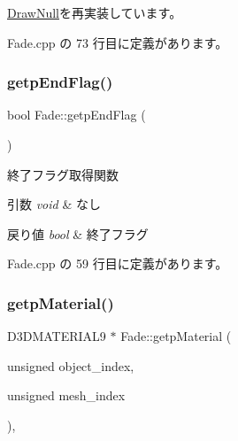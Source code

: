 \mbox{\hyperlink{class_draw_null_a98cc7cd43b19d9d70cc621d23d89286f}{Draw\+Null}}を再実装しています。



 Fade.\+cpp の 73 行目に定義があります。

\mbox{\label{class_fade_a7abd60e0881a5b7e9548ec544a0e2198}} 
\subsubsection{\texorpdfstring{getp\+End\+Flag()}{getpEndFlag()}}
{\footnotesize\ttfamily bool Fade\+::getp\+End\+Flag (\begin{DoxyParamCaption}{ }\end{DoxyParamCaption})}



終了フラグ取得関数 


\begin{DoxyParams}{引数}
{\em void} & なし \\
\hline
\end{DoxyParams}

\begin{DoxyRetVals}{戻り値}
{\em bool} & 終了フラグ \\
\hline
\end{DoxyRetVals}


 Fade.\+cpp の 59 行目に定義があります。

\mbox{\label{class_fade_adbd049cfdaf165670d1b97b03151a5cd}} 
\subsubsection{\texorpdfstring{getp\+Material()}{getpMaterial()}}
{\footnotesize\ttfamily D3\+D\+M\+A\+T\+E\+R\+I\+A\+L9 $\ast$ Fade\+::getp\+Material (\begin{DoxyParamCaption}\item[{unsigned}]{object\+\_\+index,  }\item[{unsigned}]{mesh\+\_\+index }\end{DoxyParamCaption})\hspace{0.3cm}{\ttfamily [override]}, {\ttfamily [virtual]}}




